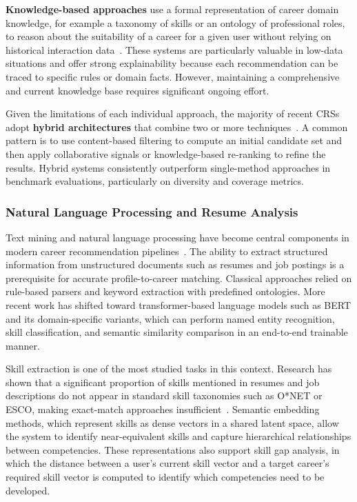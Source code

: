 \documentclass[12pt,a4paper]{article}
\begin{document}
\textbf{Knowledge-based approaches} use a formal representation of career domain knowledge, for example a taxonomy of skills or an ontology of professional roles, to reason about the suitability of a career for a given user without relying on historical interaction data~\cite{ndolo2023job}. These systems are particularly valuable in low-data situations and offer strong explainability because each recommendation can be traced to specific rules or domain facts. However, maintaining a comprehensive and current knowledge base requires significant ongoing effort.

Given the limitations of each individual approach, the majority of recent CRSs adopt \textbf{hybrid architectures} that combine two or more techniques~\cite{ndolo2023job, jobrec_arxiv2021}. A common pattern is to use content-based filtering to compute an initial candidate set and then apply collaborative signals or knowledge-based re-ranking to refine the results. Hybrid systems consistently outperform single-method approaches in benchmark evaluations, particularly on diversity and coverage metrics.

\subsubsection*{Natural Language Processing and Resume Analysis}

Text mining and natural language processing have become central components in modern career recommendation pipelines~\cite{jobrec_arxiv2021}. The ability to extract structured information from unstructured documents such as resumes and job postings is a prerequisite for accurate profile-to-career matching. Classical approaches relied on rule-based parsers and keyword extraction with predefined ontologies. More recent work has shifted toward transformer-based language models such as BERT and its domain-specific variants, which can perform named entity recognition, skill classification, and semantic similarity comparison in an end-to-end trainable manner.

Skill extraction is one of the most studied tasks in this context. Research has shown that a significant proportion of skills mentioned in resumes and job descriptions do not appear in standard skill taxonomies such as O*NET or ESCO, making exact-match approaches insufficient~\cite{jobrec_arxiv2021}. Semantic embedding methods, which represent skills as dense vectors in a shared latent space, allow the system to identify near-equivalent skills and capture hierarchical relationships between competencies. These representations also support skill gap analysis, in which the distance between a user's current skill vector and a target career's required skill vector is computed to identify which competencies need to be developed.
\end{document}
